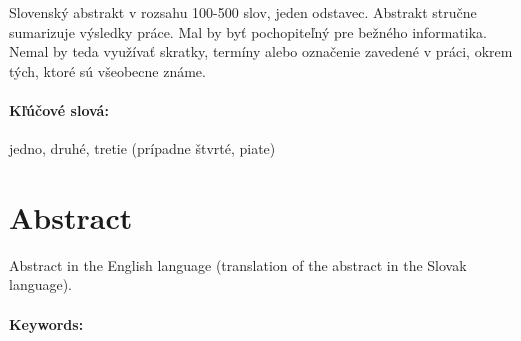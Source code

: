 \documentclass[12pt, twoside]{book}
\begin{document}
Slovenský abstrakt v rozsahu 100-500 slov, jeden odstavec. Abstrakt
stručne sumarizuje výsledky práce. Mal by byť pochopiteľný pre bežného
informatika. Nemal by teda využívať skratky, termíny alebo označenie
zavedené v práci, okrem tých, ktoré sú všeobecne známe.

\paragraph*{Kľúčové slová:} jedno, druhé, tretie (prípadne štvrté, piate)


\newpage 
\section*{Abstract}

Abstract in the English language (translation of the abstract in the
Slovak language).


\paragraph*{Keywords:} 


%
%



\newpage 

\tableofcontents



\newpage 

\listoffigures
\listoftables


\mainmatter
\end{document}
